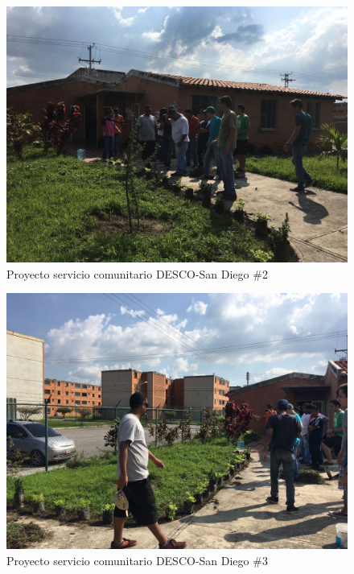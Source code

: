 \documentclass[11pt, a4paper, twosides]{report}
\begin{document}


\begin{figure}[h]
    \centering
    \includegraphics[width=0.76\linewidth]{4.jpg}
    \caption{Proyecto servicio comunitario DESCO-San Diego \#2}
    \label{fig:4}
\end{figure}

\begin{figure}[h]
    \centering
    \includegraphics[width=1\linewidth]{5.jpg}
    \caption{Proyecto servicio comunitario DESCO-San Diego \#3}
    \label{fig:5}
\end{figure}
\end{document}
